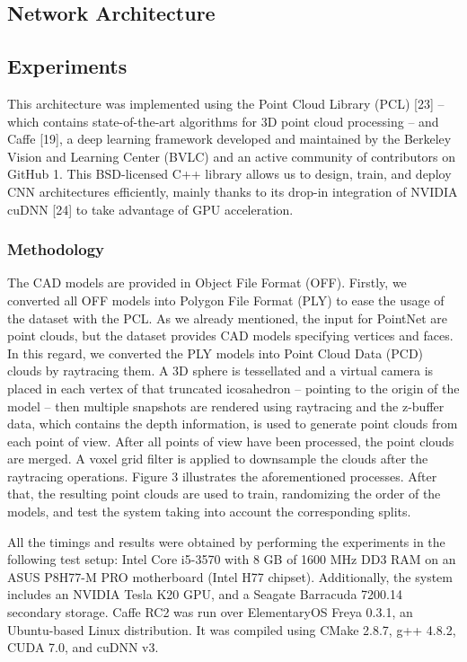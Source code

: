 \subsection{Network Architecture}
\label{cha:objrecog:sec:pointnet:subsec:network}

\subsection{Experiments}
\label{cha:objrecog:sec:pointnet:subsec:experiments}

This architecture was implemented using the Point Cloud Library (PCL) [23] – which contains state-of-the-art algorithms for 3D point cloud processing – and Caffe [19], a deep learning framework developed and maintained by the Berkeley Vision and Learning Center (BVLC) and an active community of contributors on GitHub 1. This BSD-licensed C++ library allows us to design, train, and deploy CNN architectures efficiently, mainly thanks to its drop-in integration of NVIDIA cuDNN [24] to take advantage of GPU acceleration.

\subsubsection{Methodology}

The CAD models are provided in Object File Format (OFF). Firstly, we converted all OFF models into Polygon File Format (PLY) to ease the usage of the dataset with the PCL. As we already mentioned, the input for PointNet are point clouds, but the dataset provides CAD models specifying vertices and faces. In this regard, we converted the PLY models into Point Cloud Data (PCD) clouds by raytracing them. A 3D sphere is tessellated and a virtual camera is placed in each vertex of that truncated icosahedron – pointing to the origin of the model – then multiple snapshots are rendered using raytracing and the z-buffer data, which contains the depth information, is used to generate point clouds from each point of view. After all points of view have been processed, the point clouds are merged. A voxel grid filter is applied to downsample the clouds after the raytracing operations. Figure 3 illustrates the aforementioned processes. After that, the resulting point clouds are used to train, randomizing the order of the models, and test the system taking into account the corresponding splits.

All the timings and results were obtained by performing the experiments in the following test setup: Intel Core i5-3570 with 8 GB of 1600 MHz DD3 RAM on an ASUS P8H77-M PRO motherboard (Intel H77 chipset). Additionally, the system includes an NVIDIA Tesla K20 GPU, and a Seagate Barracuda 7200.14 secondary storage. Caffe RC2 was run over ElementaryOS Freya 0.3.1, an Ubuntu-based Linux distribution. It was compiled using CMake 2.8.7, g++ 4.8.2, CUDA 7.0, and cuDNN v3.

